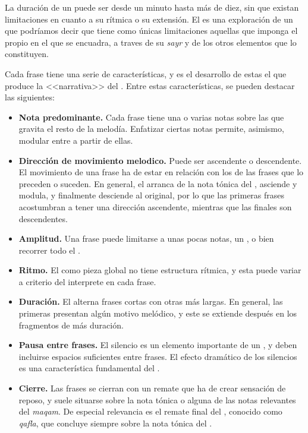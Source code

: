 La duración de un \taqsim puede ser desde un minuto hasta más de diez, sin que existan limitaciones en cuanto a su rítmica o su extensión. El \taqsim es una exploración de un \maqam que podríamos decir que tiene como únicas limitaciones aquellas que imponga el propio \maqam en el que se encuadra, a traves de su \emph{sayr} y de los otros elementos que lo constituyen.

Cada frase tiene una serie de características, y es el desarrollo de estas el que produce la <<narrativa>> del \taqsimb. Entre estas características, se pueden destacar las siguientes:

\begin{itemize}
\item \textbf{Nota predominante.} Cada frase tiene una o varias notas sobre las que gravita el resto de la melodía. Enfatizar ciertas notas permite, asimismo, modular entre \yins a partir de ellas.
\item \textbf{Dirección de movimiento melodico.} Puede ser ascendente o descendente. El movimiento de una frase ha de estar en relación con los de las frases que lo preceden o suceden. En general, el \taqsim arranca de la nota tónica del \maqamb, asciende y modula, y finalmente desciende al \maqam original, por lo que las primeras frases acostumbran a tener una dirección ascendente, mientras que las finales son descendentes.
\item \textbf{Amplitud.} Una frase puede limitarse a unas pocas notas, un \yins, o bien recorrer todo el \maqam.
\item \textbf{Ritmo.} El \taqsim como pieza global no tiene estructura rítmica, y esta puede variar a criterio del interprete en cada frase.
\item \textbf{Duración.} El \taqsim alterna frases cortas con otras más largas. En general, las primeras presentan algún motivo melódico, y este se extiende después en los fragmentos de más duración.
\item \textbf{Pausa entre frases.} El silencio es un elemento importante de un \taqsim, y deben incluirse espacios suficientes entre frases. El efecto dramático de los silencios es una característica fundamental del \taqsimb.
\item \textbf{Cierre.} Las frases se cierran con un remate que ha de crear sensación de reposo, y suele situarse sobre la nota tónica o alguna de las notas relevantes del \emph{maqam}. De especial relevancia es el remate final del \taqsimb, conocido como \emph{qafla}, que concluye siempre sobre la nota tónica del \maqam.
\end{itemize}

